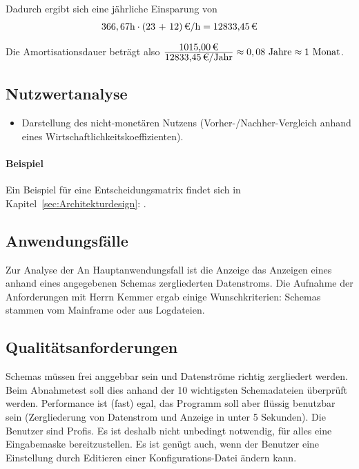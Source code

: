 Dadurch ergibt sich eine jährliche Einsparung von 
\begin{eqnarray}
366,67 \mbox{h} \cdot \eur{(23 + 12)}{\mbox{/h}} = \eur{12833,45}
\end{eqnarray}

Die Amortisationsdauer beträgt also $\frac{\eur{1015,00}}{\eur{12833,45}\mbox{/Jahr}} \approx 0,08 \mbox{ Jahre} \approx 1 \mbox{ Monat}$.


\subsection{Nutzwertanalyse}
\label{sec:Nutzwertanalyse}
\begin{itemize}
	\item Darstellung des nicht-monetären Nutzens (\zB Vorher-/Nachher-Vergleich anhand eines Wirtschaftlichkeitskoeffizienten). 
\end{itemize}

\paragraph{Beispiel}
Ein Beispiel für eine Entscheidungsmatrix findet sich in Kapitel~\ref{sec:Architekturdesign}: .


\subsection{Anwendungsfälle}
\label{sec:Anwendungsfaelle}
Zur Analyse der An
Hauptanwendungsfall ist die Anzeige das Anzeigen eines anhand eines angegebenen Schemas zergliederten Datenstroms.
Die Aufnahme der Anforderungen mit Herrn Kemmer ergab einige Wunschkriterien:
Schemas stammen vom Mainframe oder aus Logdateien.


\subsection{Qualitätsanforderungen}
\label{sec:Qualitaetsanforderungen}
Schemas müssen frei anggebbar sein und Datenströme richtig zergliedert werden.
Beim Abnahmetest soll dies anhand der 10 wichtigsten Schemadateien überprüft werden.
Performance ist (fast) egal, das Programm soll aber flüssig benutzbar sein (Zergliederung von Datenstrom und Anzeige in unter 5 Sekunden).
Die Benutzer sind Profis. Es ist deshalb nicht unbedingt notwendig, für alles eine Eingabemaske bereitzustellen. Es ist genügt auch, wenn der Benutzer eine Einstellung durch Editieren einer Konfigurations-Datei ändern kann.



